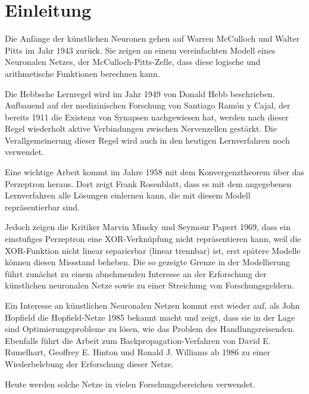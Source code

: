 
\chapter{Einleitung}
Die Anfänge der künstlichen Neuronen gehen auf Warren McCulloch und Walter Pitts im Jahr 1943 zurück. Sie zeigen an einem vereinfachten Modell eines Neuronalen Netzes, der McCulloch-Pitts-Zelle, dass diese logische und arithmetische Funktionen berechnen kann.

Die Hebbsche Lernregel wird im Jahr 1949 von Donald Hebb beschrieben. Aufbauend auf der medizinischen Forschung von Santiago Ramón y Cajal, der bereits 1911 die Existenz von Synapsen nachgewiesen hat, werden nach dieser Regel wiederholt aktive Verbindungen zwischen Nervenzellen gestärkt. Die Verallgemeinerung dieser Regel wird auch in den heutigen Lernverfahren noch verwendet.

Eine wichtige Arbeit kommt im Jahre 1958 mit dem Konvergenztheorem über das Perzeptron heraus. Dort zeigt Frank Rosenblatt, dass es mit dem angegebenen Lernverfahren alle Lösungen einlernen kann, die mit diesem Modell repräsentierbar sind.

Jedoch zeigen die Kritiker Marvin Minsky und Seymour Papert 1969, dass ein einstufiges Perzeptron eine XOR-Verknüpfung nicht repräsentieren kann, weil die XOR-Funktion nicht linear separierbar (linear trennbar) ist, erst spätere Modelle können diesen Missstand beheben. Die so gezeigte Grenze in der Modellierung führt zunächst zu einem abnehmenden Interesse an der Erforschung der künstlichen neuronalen Netze sowie zu einer Streichung von Forschungsgeldern.

Ein Interesse an künstlichen Neuronalen Netzen kommt erst wieder auf, als John Hopfield die Hopfield-Netze 1985 bekannt macht und zeigt, dass sie in der Lage sind Optimierungsprobleme zu lösen, wie das Problem des Handlungsreisenden.\cite{neuro} Ebenfalls führt die Arbeit zum Backpropagation-Verfahren von David E. Rumelhart, Geoffrey E. Hinton und Ronald J. Williams ab 1986 zu einer Wiederbelebung der Erforschung dieser Netze.

Heute werden solche Netze in vielen Forschungsbereichen verwendet.
